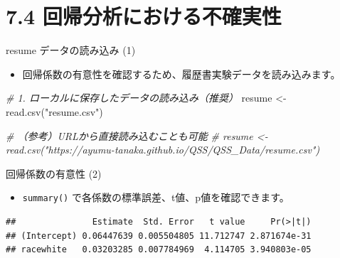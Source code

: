 \documentclass[
  ignorenonframetext,
]{beamer}
\newenvironment{Shaded}{\begin{snugshade}}{\end{snugshade}}
\newcommand{\AttributeTok}[1]{\textcolor[rgb]{0.77,0.63,0.00}{#1}}
\newcommand{\CommentTok}[1]{\textcolor[rgb]{0.56,0.35,0.01}{\textit{#1}}}
\newcommand{\FunctionTok}[1]{\textcolor[rgb]{0.00,0.00,0.00}{#1}}
\newcommand{\NormalTok}[1]{#1}
\newcommand{\OtherTok}[1]{\textcolor[rgb]{0.56,0.35,0.01}{#1}}
\newcommand{\SpecialCharTok}[1]{\textcolor[rgb]{0.00,0.00,0.00}{#1}}
\newcommand{\StringTok}[1]{\textcolor[rgb]{0.31,0.60,0.02}{#1}}
\providecommand{\tightlist}{%
  \setlength{\itemsep}{0pt}\setlength{\parskip}{0pt}}
\begin{document}
\hypertarget{ux56deux5e30ux5206ux6790ux306bux304aux3051ux308bux4e0dux78baux5b9fux6027}{%
\section{7.4
回帰分析における不確実性}\label{ux56deux5e30ux5206ux6790ux306bux304aux3051ux308bux4e0dux78baux5b9fux6027}}

\begin{frame}[fragile]{resume データの読み込み (1)}
\protect\hypertarget{resume-ux30c7ux30fcux30bfux306eux8aadux307fux8fbcux307f-1}{}
\begin{itemize}
\tightlist
\item
  回帰係数の有意性を確認するため、履歴書実験データを読み込みます。
\end{itemize}

\scriptsize

\begin{Shaded}
\begin{Highlighting}[]
\CommentTok{\# 1. ローカルに保存したデータの読み込み（推奨）}
\NormalTok{resume }\OtherTok{\textless{}{-}} \FunctionTok{read.csv}\NormalTok{(}\StringTok{"resume.csv"}\NormalTok{)}

\CommentTok{\# （参考）URLから直接読み込むことも可能}
\CommentTok{\# resume \textless{}{-} read.csv("https://ayumu{-}tanaka.github.io/QSS/QSS\_Data/resume.csv")}
\end{Highlighting}
\end{Shaded}

\normalsize
\end{frame}

\begin{frame}[fragile]{回帰係数の有意性 (2)}
\protect\hypertarget{ux56deux5e30ux4fc2ux6570ux306eux6709ux610fux6027-2}{}
\begin{itemize}
\tightlist
\item
  \texttt{summary()} で各係数の標準誤差、t値、p値を確認できます。
\end{itemize}

\scriptsize

\begin{Shaded}
\end{Shaded}

\begin{verbatim}
##               Estimate  Std. Error   t value     Pr(>|t|)
## (Intercept) 0.06447639 0.005504805 11.712747 2.871674e-31
## racewhite   0.03203285 0.007784969  4.114705 3.940803e-05
\end{verbatim}

\normalsize
\end{frame}
\end{document}
